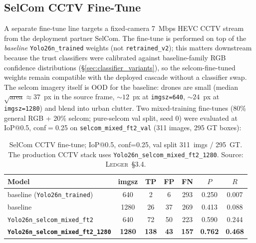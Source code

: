 \documentclass[12pt,a4paper,oneside,openright]{book}
\begin{document}
\subsection{SelCom CCTV Fine-Tune}
\label{sec:selcom_finetune}

A separate fine-tune line targets a fixed-camera 7~Mbps HEVC CCTV stream from the deployment partner SelCom. The fine-tune is performed on top of the \emph{baseline} \texttt{Yolo26n\_trained} weights (not \texttt{retrained\_v2}); this matters downstream because the trust classifiers were calibrated against baseline-family RGB confidence distributions (\S\ref{sec:classifier_variants}), so the selcom-fine-tuned weights remain compatible with the deployed cascade without a classifier swap. The selcom imagery itself is OOD for the baseline: drones are small (median $\sqrt{\text{area}} \approx 37$~px in the source frame, $\sim 12$~px at \texttt{imgsz=640}, $\sim 24$~px at \texttt{imgsz=1280}) and blend into urban clutter. Two mixed-training fine-tunes (80\% general RGB + 20\% selcom; pure-selcom val split, seed 0) were evaluated at IoP@0.5, conf$=$0.25 on \texttt{selcom\_mixed\_ft2\_val} (311 images, 295 GT boxes):

\begin{table}[htbp]
    \centering
    \caption{SelCom CCTV fine-tune; IoP@0.5, conf=0.25, val split 311~imgs / 295~GT. The production CCTV stack uses \texttt{Yolo26n\_selcom\_mixed\_ft2\_1280}. Source: \textsc{Ledger}~\S3.4.}
    \label{tab:selcom}
    \begin{tabular}{lcccccc}
        \toprule
        Model & imgsz & TP & FP & FN & $P$ & $R$ \\
        \midrule
        baseline (\texttt{Yolo26n\_trained})        & 640  &   2 &  6 & 293 & 0.250 & 0.007 \\
        baseline                                    & 1280 &  26 & 37 & 269 & 0.413 & 0.088 \\
        \texttt{Yolo26n\_selcom\_mixed\_ft2}        & 640  &  72 & 50 & 223 & 0.590 & 0.244 \\
        \textbf{\texttt{Yolo26n\_selcom\_mixed\_ft2\_1280}} & \textbf{1280} & \textbf{138} & \textbf{43} & \textbf{157} & \textbf{0.762} & \textbf{0.468} \\
        \bottomrule
    \end{tabular}
\end{table}
\end{document}
